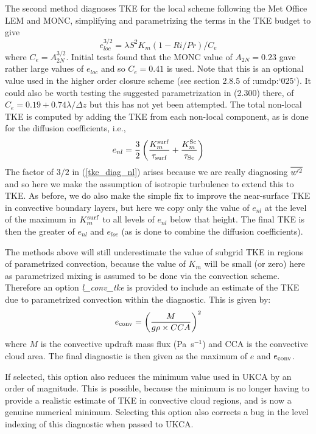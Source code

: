 \documentclass{UMDP_article}
\newcommand{\citeumdp}[1]{:umdp:`#1`}
\begin{document}
The second method diagnoses TKE for the local scheme following the Met Office 
LEM and MONC, simplifying and parametrizing the terms in the TKE budget to give
\begin{equation}
  e_{loc}^{3/2} = \lambda S^2 K_m (1-Ri/Pr)/C_{e}
  \label{tke_diag_loc}
\end{equation}
where $C_{e}=A_{2N}^{3/2}$.  Initial tests found that the MONC value of 
$A_{2N}=0.23$ gave rather large values of $e_{loc}$ and so $C_e=0.41$ is used.  Note 
that this is an optional value used in the higher order closure scheme (see section 
2.8.5 of \citeumdp{025}).  It could also be worth testing the suggested parametrization in 
(2.300) there, of $C_e=0.19+0.74 \lambda/\Delta z$ but this has not yet been attempted.  
The total non-local TKE is computed by adding the TKE from each non-local component, 
as is done for the diffusion coefficients, \mbox{i.e.}, 
\begin{equation}
  e_{nl} = \frac{3}{2} \left( \frac{K_m^{\rm surf}}{\tau_{\rm surf}} 
                           + \frac{K_m^{\rm Sc}}{\tau_{\rm Sc}} \right)
  \label{tke_diag_nl}
\end{equation}
The factor of $3/2$ in (\ref{tke_diag_nl}) arises because we are really diagnosing 
$\overline{w'^2}$ and so here we make the assumption of isotropic turbulence to extend 
this to TKE.  As before, we do also make the simple fix to improve the near-surface 
TKE in convective boundary layers, but here we copy only the value of $e_{nl}$ at the 
level of the maximum in $K_m^{\rm surf}$ to all levels of $e_{nl}$ below that height.  The 
final TKE is then the greater of $e_{nl}$ and $e_{loc}$ (as is done to combine the 
diffusion coefficients).   

The methods above will still underestimate the value of subgrid TKE in
regions of parametrized convection, because the value of $K_m$ will be
small (or zero) here as parametrized mixing is assumed to be done via
the convection scheme. Therefore an option {\sl l\_conv\_tke} is
provided to include an estimate of the TKE due to parametrized
convection within the diagnostic. This is given by:
\begin{equation}
e_{\rm conv} = \left(\frac{M}{g\rho \times CCA}\right)^2
\end{equation}
where $M$ is the convective updraft mass flux (Pa~s$^{-1}$) and CCA is
the convective cloud area. The final diagnostic is then given as the
maximum of $e$ and $e_{\rm conv}$.

If selected, this option also reduces the minimum value used in UKCA
by an order of magnitude. This is possible, because the minimum is no
longer having to provide a realistic estimate of TKE in convective
cloud regions, and is now a genuine numerical minimum. Selecting this
option also corrects a bug in the level indexing of this diagnostic
when passed to UKCA.
\end{document}
